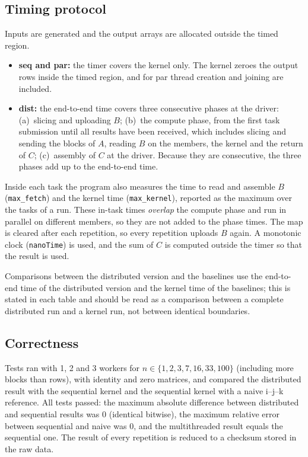 \documentclass[11pt,a4paper]{article}
\begin{document}
\subsection{Timing protocol}
Inputs are generated and the output arrays are allocated outside the timed region.
\begin{itemize}
  \item \textbf{seq and par:} the timer covers the kernel only. The kernel zeroes the
        output rows inside the timed region, and for par thread creation and joining are
        included.
  \item \textbf{dist:} the end-to-end time covers three consecutive phases at the driver:
        (a)~slicing and uploading $B$; (b)~the compute phase, from the first task submission
        until all results have been received, which includes slicing and sending the blocks of
        $A$, reading $B$ on the members, the kernel and the return of $C$; (c)~assembly of
        $C$ at the driver. Because they are consecutive, the three phases add up to the
        end-to-end time.
\end{itemize}
Inside each task the program also measures the time to read and assemble $B$
(\texttt{max\_fetch}) and the kernel time (\texttt{max\_kernel}), reported as the maximum over
the tasks of a run. These in-task times \emph{overlap} the compute phase and run in parallel on
different members, so they are not added to the phase times. The map is cleared after each
repetition, so every repetition uploads $B$ again. A monotonic clock (\texttt{nanoTime}) is
used, and the sum of $C$ is computed outside the timer so that the result is used.

Comparisons between the distributed version and the baselines use the end-to-end time of the
distributed version and the kernel time of the baselines; this is stated in each table and
should be read as a comparison between a complete distributed run and a kernel run, not between
identical boundaries.

\subsection{Correctness}
Tests ran with 1, 2 and 3 workers for $n\in\{1,2,3,7,16,33,100\}$ (including more blocks than
rows), with identity and zero matrices, and compared the distributed result with the
sequential kernel and the sequential kernel with a naive i--j--k reference. All tests passed:
the maximum absolute difference between distributed and sequential results was 0 (identical
bitwise), the maximum relative error between sequential and naive was 0, and the multithreaded
result equals the sequential one. The result of every repetition is reduced to a checksum
stored in the raw data.
\end{document}
